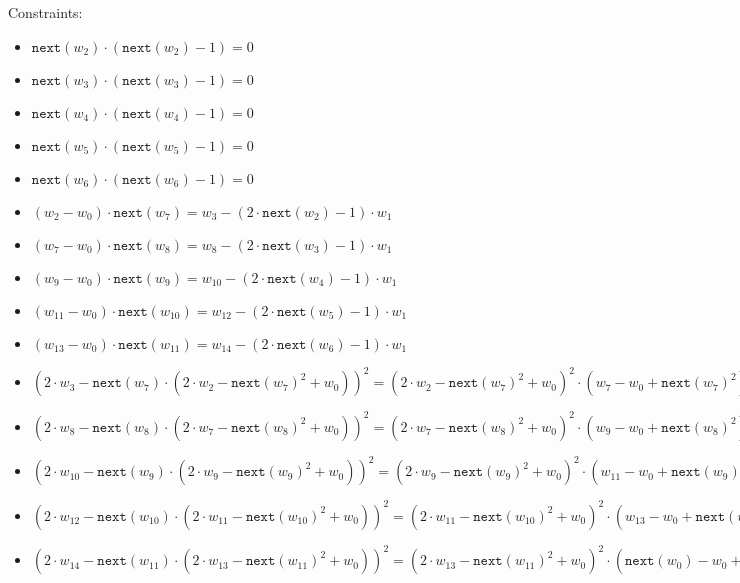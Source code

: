 Constraints:
\begin{itemize}
    \item $\texttt{next}(w_2) \cdot (\texttt{next}(w_2) - 1) = 0$
    \item $\texttt{next}(w_3) \cdot (\texttt{next}(w_3) - 1) = 0$
    \item $\texttt{next}(w_4) \cdot (\texttt{next}(w_4) - 1) = 0$
    \item $\texttt{next}(w_5) \cdot (\texttt{next}(w_5) - 1) = 0$
    \item $\texttt{next}(w_6) \cdot (\texttt{next}(w_6) - 1) = 0$ \\

    \item $(w_{2} - w_{0}) \cdot \texttt{next}(w_7) = w_3 - (2 \cdot \texttt{next}(w_{2}) - 1) \cdot w_1$
    \item $(w_{7} - w_{0}) \cdot \texttt{next}(w_8) = w_8 - (2 \cdot \texttt{next}(w_{3}) - 1) \cdot w_1$
    \item $(w_{9} - w_{0}) \cdot \texttt{next}(w_9) = w_{10} - (2 \cdot \texttt{next}(w_{4}) - 1) \cdot w_1$
    \item $(w_{11} - w_{0}) \cdot \texttt{next}(w_{10}) = w_{12} - (2 \cdot \texttt{next}(w_{5}) - 1) \cdot w_1$
    \item $(w_{13} - w_{0}) \cdot \texttt{next}(w_{11}) = w_{14} - (2 \cdot \texttt{next}(w_{6}) - 1) \cdot w_1$ \\
    
    
    \item $(2\cdot w_{3} - \texttt{next}(w_7) \cdot (2 \cdot w_2 - \texttt{next}(w_7)^2 + w_{0}))^2 =  (2 \cdot w_2 - \texttt{next}(w_7)^2 + w_{0})^2 \cdot (w_7 - w_0 + \texttt{next}(w_7)^2)$
    \item $(2\cdot w_{8} - \texttt{next}(w_8) \cdot (2 \cdot w_7 - \texttt{next}(w_8)^2 + w_{0}))^2 =  (2 \cdot w_7 - \texttt{next}(w_8)^2 + w_{0})^2 \cdot (w_9 - w_0 + \texttt{next}(w_8)^2)$
    \item $(2\cdot w_{10} - \texttt{next}(w_9) \cdot (2 \cdot w_9 - \texttt{next}(w_9)^2 + w_{0}))^2 =  (2 \cdot w_9 - \texttt{next}(w_9)^2 + w_{0})^2 \cdot (w_{11} - w_0 + \texttt{next}(w_9)^2)$
    \item $(2\cdot w_{12} - \texttt{next}(w_{10}) \cdot (2 \cdot w_{11} - \texttt{next}(w_{10})^2 + w_{0}))^2 =  (2 \cdot w_{11} - \texttt{next}(w_{10})^2 + w_{0})^2 \cdot (w_{13} - w_0 + \texttt{next}(w_{10})^2)$
    \item $(2\cdot w_{14} - \texttt{next}(w_{11}) \cdot (2 \cdot w_{13} - \texttt{next}(w_{11})^2 + w_{0}))^2 =  (2 \cdot w_{13} - \texttt{next}(w_{11})^2 + w_{0})^2 \cdot (\texttt{next}(w_0) - w_0 + \texttt{next}(w_{11})^2)$ \\
    

\end{itemize}

